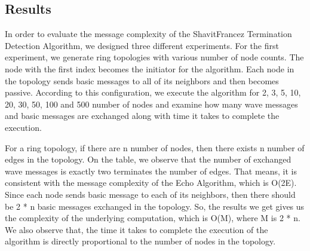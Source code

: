 \documentclass[letterpaper,10pt,english]{sphinxmanual}
\begin{document}
\subsection{Results}
\label{\detokenize{docs/ShavitFrancez/results:results}}
\sphinxAtStartPar
In order to evaluate the message complexity of the Shavit\sphinxhyphen{}Francez Termination Detection Algorithm, we designed three different experiments. For the first experiment, we generate ring topologies with various number of node counts. The node with the first index becomes the initiator for the algorithm. Each node in the topology sends basic messages to all of its neighbors and then becomes passive. According to this configuration, we execute the algorithm for 2, 3, 5, 10, 20, 30, 50, 100 and 500 number of nodes and examine how many wave messages and basic messages are exchanged along with time it takes to complete the execution.

\sphinxAtStartPar
For a ring topology, if there are n number of nodes, then there exists n number of edges in the topology. On the table, we observe that the number of exchanged wave messages is exactly two terminates the number of edges. That means, it is consistent with the message complexity of the Echo Algorithm, which is O(2E). Since each node sends basic message to each of its neighbors, then there should be 2 * n basic messages exchanged in the topology. So, the results we get gives us the complexity of the underlying computation, which is O(M), where M is 2 * n. We also observe that, the time it takes to complete the execution of the algorithm is directly proportional to the number of nodes in the topology.
\end{document}
